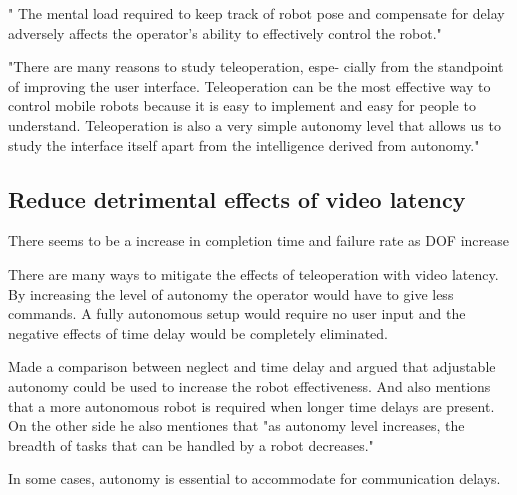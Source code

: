 \citep{Ricks2004} " The mental load required to keep track of robot pose and compensate for delay adversely affects the operator's ability to effectively control the robot."

"There are many reasons to study teleoperation, espe-
cially from the standpoint of improving the user interface. Teleoperation can be the most effective way to control mobile robots because it is easy to implement and easy for people to understand. Teleoperation is also a very simple autonomy level that allows us to study the interface itself apart from the intelligence derived from autonomy."

\subsection{Reduce detrimental effects of video latency}

There seems to be a increase in completion time and failure rate as DOF increase

There are many ways to mitigate the effects of teleoperation with video latency. By increasing the level of autonomy the operator would have to give less commands. A fully autonomous setup would require no user input and the negative effects of time delay would be completely eliminated.

\citep{Goodrich2001} Made a comparison between neglect and time delay and argued that adjustable autonomy could be used to increase the robot effectiveness. And also mentions that a more autonomous robot is required when longer time delays are present. On the other side he also mentiones that "as autonomy level increases, the breadth of tasks that can be handled by a robot decreases."

In some cases, autonomy is essential to accommodate for communication delays. \citep{Dorais1999}

